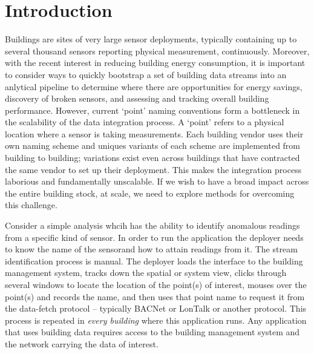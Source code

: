 \section{Introduction}

Buildings are sites of very large sensor deployments, typically containing
up to several thousand sensors reporting physical measurement, continuously.
Moreover, with the recent interest in reducing building energy consumption, it
is important to consider ways to quickly bootstrap a set of building data streams
into an anlytical pipeline to determine where there are opportunities for energy savings,
discovery of broken sensors, and assessing and tracking overall building performance.
However, current `point' naming conventions form a bottleneck in the scalability of
the data integration process.  A `point' refers to a physical location where
a sensor is taking measurements. Each building vendor uses their own naming scheme and
uniques variants of each scheme are implemented from building to building; variations exist
even across buildings that have contracted the same vendor to set up their deployment.
This makes the integration process laborious and fundamentally unscalable.  If we
wish to have a broad impact across the entire building stock, at scale, we need
to explore methods for overcoming this challenge.

Consider a simple analysis whcih has the ability
to identify anomalous readings from a specific kind of sensor.  In order to run the application
the deployer needs to know the name of the sensorand how to attain readings from it.
The stream identification process is manual.  The deployer loads the interface to the 
building management system, tracks down the spatial or system view, clicks through several windows
to locate the location of the point(s) of interest, mouses over the point(s) and records the name,
and then uses that point name to request it from the data-fetch protocol -- typically BACNet or 
LonTalk or another protocol. This process is repeated in \emph{every building} where this 
application runs.  Any application that uses building data requires access to the building
management system and the network carrying the data of interest.

